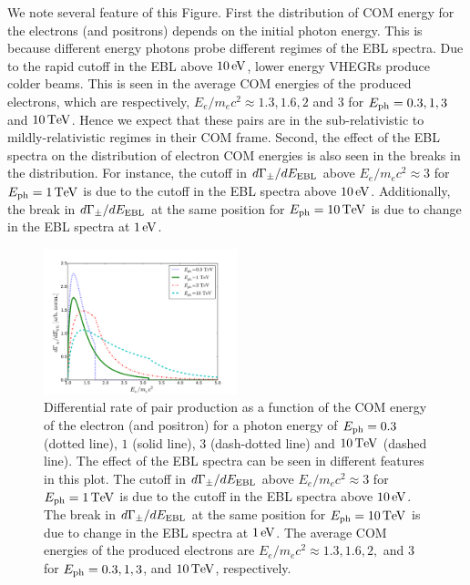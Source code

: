 \documentclass[usenatbib,iop,apj,numberedappendix]{aeb_emulateapj_2015}
\def\eV{{\rm eV}} %
\def\TeV{{\rm T}\eV} %
\begin{document}
We note several feature of this Figure.  First the distribution of COM energy for the electrons (and positrons) depends on the initial photon energy. This is because different energy photons probe different regimes of the EBL spectra.  Due to the rapid cutoff in the EBL above $10\,\eV$, lower energy VHEGRs produce colder beams.  This is seen in the average COM energies of the produced electrons, which are respectively, $E_e/m_e c^2 \approx 1.3, 1.6, 2$ and $3$ for $E_{\rm ph} = 0.3, 1, 3$ and $10\,\TeV$. Hence we expect that these pairs are in the sub-relativistic to mildly-relativistic regimes in their COM frame.
Second, the effect of the EBL spectra on the distribution of electron COM energies is also seen in the breaks in the distribution.  For instance, the cutoff in $d\Gamma_{\pm}/dE_{\rm EBL}$ above $E_e/m_e c^2 \approx 3$ for $E_{\rm ph} = 1\,\TeV$ is due to the cutoff in the EBL spectra above $10\,\eV$.  Additionally, the break in $d\Gamma_{\pm}/dE_{\rm EBL}$ at the same position for $E_{\rm ph} = 10\,\TeV$ is due to change in the EBL spectra at $1\,\eV$.  

\begin{figure}
 \includegraphics[width=0.5\textwidth]{rates.pdf}
 \caption{Differential rate of pair production as a function of the COM energy of the electron (and positron) for a photon energy of $E_{\rm ph} = 0.3$ (dotted line), $1$ (solid line), $3$ (dash-dotted line) and $10\,\TeV$ (dashed line).  The effect of the EBL spectra can be seen in different features in this plot.  The cutoff in $d\Gamma_{\pm}/dE_{\rm EBL}$ above $E_e/m_e c^2 \approx 3$ for $E_{\rm ph} = 1\,\TeV$ is due to the cutoff in the EBL spectra above $10\,\eV$.  The break in $d\Gamma_{\pm}/dE_{\rm EBL}$ at the same position for $E_{\rm ph} = 10\,\TeV$ is due to change in the EBL spectra at $1\,\eV$. The average COM energies of the produced electrons are $E_e/m_e c^2 \approx 1.3, 1.6, 2,$ and $3$ for $E_{\rm ph} = 0.3, 1, 3$, and $10\,\TeV$, respectively.  
 \label{fig:rates}}
\end{figure}
\end{document}
